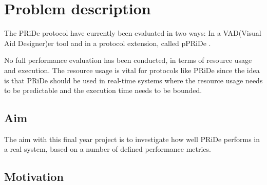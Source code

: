 

\section{Problem description}
\label{sec:problem_description}



The PRiDe protocol have currently been evaluated in two ways: In a VAD(Visual Aid Designer)er tool \cite{Syber2007} and in a protocol extension, called pPRiDe \cite[]{Olby07}. 

No full performance evaluation has been conducted, in terms of resource usage and execution. The resource usage is vital for protocols like PRiDe since the idea is that PRiDe should be used in real-time systems where the resource usage needs to be predictable and the execution time needs to be bounded. 

\subsection{Aim}
\label{subsec:aim}

The aim with this final year project is to investigate how well PRiDe performs in a real system, based on a number of defined performance metrics.  

\subsection{Motivation}
\label{subsec:motive}

